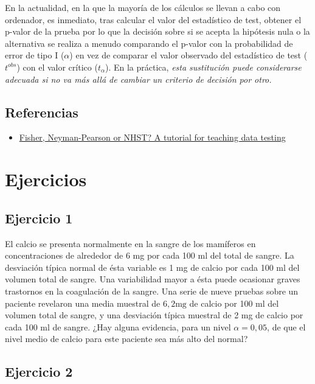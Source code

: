 \documentclass[
]{article}
\providecommand{\tightlist}{%
  \setlength{\itemsep}{0pt}\setlength{\parskip}{0pt}}
\begin{document}
En la actualidad, en la que la mayoría de los cálculos se llevan a cabo con ordenador, es inmediato, tras calcular el valor del estadístico de test, obtener el p-valor de la prueba por lo que la decisión sobre si se acepta la hipótesis nula o la alternativa se realiza a menudo comparando el p-valor con la probabilidad de error de tipo I (\(\alpha\)) en vez de comparar el valor observado del estadístico de test (\(t^{obs}\)) con el valor crítico (\(t_\alpha\)). En la práctica, \emph{esta sustitución puede considerarse adecuada si no va más allá de cambiar un criterio de decisión por otro.}

\subsection{Referencias}\label{referencias}

\begin{itemize}
\tightlist
\item
  \href{https://pmc.ncbi.nlm.nih.gov/articles/PMC4347431/}{Fisher, Neyman-Pearson or NHST? A tutorial for teaching data testing}
\end{itemize}

\section{Ejercicios}\label{ejercicios}

\subsection{Ejercicio 1}\label{ejercicio-1-4}

El calcio se presenta normalmente en la sangre de los mamíferos en concentraciones de alrededor de 6 mg por cada 100 ml del total de sangre. La desviación típica normal de ésta variable es 1 mg de calcio por cada 100 ml del volumen total de sangre. Una variabilidad mayor a ésta puede ocasionar graves trastornos en la coagulación de la sangre. Una serie de nueve pruebas sobre un paciente revelaron una media muestral de \(6,2 \mathrm{mg}\) de calcio por 100 ml del volumen total de sangre, y una desviación típica muestral de 2 mg de calcio por cada 100 ml de sangre. ¿Hay alguna evidencia, para un nivel \(\alpha=0,05\), de que el nivel medio de calcio para este paciente sea más alto del normal?

\subsection{Ejercicio 2}\label{ejercicio-2-5}
\end{document}
